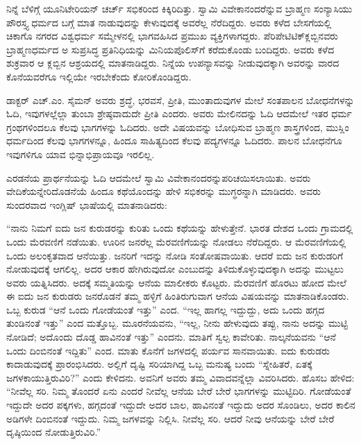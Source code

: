 ನಿನ್ನೆ ಬೆಳಿಗ್ಗೆ ಯೂನಿಟೇರಿಯನ್​ ಚರ್ಚ್​ ಸಭಿಕರಿಂದ ಕಿಕ್ಕಿರಿದಿತ್ತು. ಸ್ವಾಮಿ ವಿವೇಕಾನಂದ\break ರೆನ್ನುವ ಬ್ರಾಹ್ಮಣ ಸಂನ್ಯಾಸಿಯು ಪೌರಸ್ತ್ಯ ಧರ್ಮದ ಬಗ್ಗೆ ಮಾತ ನಾಡುವುದನ್ನು ಕೇಳುವುದಕ್ಕೆ ಅವರೆಲ್ಲ ನೆರೆದಿದ್ದರು. ಅವರು ಕಳೆದ ಬೇಸಗೆಯಲ್ಲಿ ಚಿಕಾಗೊ ನಗರದ ವಿಶ್ವಧರ್ಮ ಸಮ್ಮೇಳನಲ್ಲಿ ಭಾಗವಹಿಸಿದ ಪ್ರಮುಖ ವ್ಯಕ್ತಿಗಳಾಗದ್ದರು. ಪೆರಿಪೇಟಿಟಿಕ್​ ಕ್ಲಬ್ಬಿನವರು ಬ್ರಾಹ್ಮಣಧರ್ಮದ ಅ ಸುಪ್ರಸಿದ್ಧ ಪ್ರತಿನಿಧಿಯನ್ನು ಮಿನಿಯಪೊಲಿಸ್​ಗೆ ಕರೆದುಕೊಂಡು ಬಂದಿದ್ದರು. ಅವರು ಕಳೆದ ಶುಕ್ರವಾರ ಆ ಕ್ಲಬ್ಬಿನ ಆಶ್ರಯದಲ್ಲಿ ಮಾತನಾಡಿದ್ದರು. ನಿನ್ನೆಯ ಉಪನ್ಯಾಸವನ್ನು ನೀಡುವುದಕ್ಕಾಗಿ ಅವರನ್ನು ವಾರದ ಕೊನೆಯವರೆಗೂ ಇಲ್ಲಿಯೇ ಇರಬೇಕೆಂದು ಕೋರಿಕೊಂಡಿದ್ದರು.

ಡಾಕ್ಟರ್​ ಎಚ್​.ಎಂ. ಸೈಮನ್​ ಅವರು ಶ್ರದ್ಧೆ, ಭರವಸೆ, ಪ್ರೀತಿ, ಮುಂತಾದುವುಗಳ ಮೇಲೆ ಸಂತಪಾಲನ ಬೋಧನೆಗಳನ್ನು ಓದಿ, ಇವುಗಳಲ್ಲೆಲ್ಲಾ ತುಂಬಾ ಶ್ರೇಷ್ಠವಾದುದೇ ಪ್ರೀತಿ ಎಂದರು. ಅವರು ಮೇಲಿನದನ್ನು ಓದಿ ಆದಮೇಲೆ ಇತರ ಧರ್ಮ ಗ್ರಂಥಗಳಿಂದಲೂ ಕೆಲವು ಭಾಗಗಳನ್ನು ಓದಿದರು. ಅದೇ ವಿಷಯವನ್ನು ಬೋಧಿಸುವ ಬ್ರಾಹ್ಮಣ ಶಾಸ್ತ್ರಗಳಿಂದ, ಮುಸ್ಲಿಂ ಧರ್ಮದಿಂದ ಕೆಲವು ಭಾಗಗಳನ್ನೂ, ಹಿಂದೂ ಸಾಹಿತ್ಯದಿಂದ ಕೆಲವು ಪದ್ಯಗಳನ್ನೂ ಓದಿದರು. ಪಾಲನ ಬೋಧನೆಗೂ ಇವುಗಳಿಗೂ ಯಾವ ಭಿನ್ನಾಭಿಪ್ರಾಯವೂ ಇರಲಿಲ್ಲ.

ಎರಡನೆಯ ಪ್ರಾರ್ಥನೆಯನ್ನು ಓದಿ ಆದಮೇಲೆ ಸ್ವಾಮಿ ವಿವೇಕಾನಂದರನ್ನು\break ಪರಿಚಯಿಸಲಾಯಿತು. ಅವರು ವೇದಿಕೆಯನ್ನೇರಿದೊಡನೆಯೆ ಹಿಂದೂ ಕಥೆಯೊಂದನ್ನು ಹೇಳಿ ಸಭಿಕರನ್ನು ಮುಗ್ಧರನ್ನಾಗಿ ಮಾಡಿದರು. ಅವರು ಸುಂದರವಾದ ಇಂಗ್ಲಿಷ್​ ಭಾಷೆಯಲ್ಲಿ ಮಾತನಾಡಿದರು:

“ನಾನು ನಿಮಗೆ ಐದು ಜನ ಕುರುಡರನ್ನು ಕುರಿತು ಒಂದು ಕಥೆಯನ್ನು ಹೇಳುತ್ತೇನೆ. ಭಾರತ ದೇಶದ ಒಂದು ಗ್ರಾಮದಲ್ಲಿ ಒಂದು ಮೆರವಣಿಗೆ ನಡೆಯಿತು. ಊರಿನ ಜನರೆಲ್ಲ ಮೆರವಣಿಗೆಯನ್ನು ನೋಡಲು ನೆರೆದಿದ್ದರು. ಆ ಮೆರವಣಿಗೆಯಲ್ಲಿ ಒಂದು ಅಲಂಕೃತವಾದ ಆನೆಯಿತ್ತು. ಜನರಿಗೆ ಇದನ್ನು ನೋಡಿ ಸಂತೋಷವಾಯಿತು. ಆದರೆ ಐದು ಜನ ಕುರುಡರಿಗೆ ನೋಡುವುದಕ್ಕೆ ಆಗಲಿಲ್ಲ. ಅದರ ಆಕಾರ ಹೇಗಿರುವುದೋ ಎಂಬುದನ್ನು ತಿಳಿದುಕೊಳ್ಳುವುದಕ್ಕಾಗಿ ಅದನ್ನು ಮುಟ್ಟಲು ಅವರು ಯತ್ನಿಸಿದರು. ಅದಕ್ಕೆ ಸಮ್ಮತಿಯನ್ನು ಆನೆಯ ಮಾಲೀಕರು ಕೊಟ್ಟರು. ಮೆರವಣಿಗೆ ಹೊರಟು ಹೋದ ಮೇಲೆ ಈ ಐದು ಜನ ಕುರುಡರು ಜನರೊಡನೆ ತಮ್ಮ ಹಳ್ಳಿಗೆ ಹಿಂತಿರುಗುವಾಗ ಆನೆಯ ವಿಷಯವನ್ನು ಮಾತನಾಡಿಕೊಂಡರು. ಒಬ್ಬ ಕುರುಡ “ಆನೆ ಒಂದು ಗೋಡೆಯಂತೆ ಇತ್ತು” ಎಂದ. “ಇಲ್ಲ ಹಾಗಲ್ಲ ಇದ್ದುದ್ದು, ಅದು ಒಂದು ಹಗ್ಗದ ತುಂಡಿನಂತೆ ಇತ್ತು” ಎಂದ ಮತ್ತೊಬ್ಬ. ಮೂರನೆಯವನು, “ಇಲ್ಲ, ನೀನು ಹೇಳುವುದು ತಪ್ಪು, ನಾನು ಅದನ್ನು ಮುಟ್ಟಿ ನೋಡಿದೆ; ಅದೊಂದು ದೊಡ್ಡ ಹಾವಿನಂತೆ ಇತ್ತು” ಎಂದನು. ಮಾತಿಗೆ ಸ್ವಲ್ಪ ಕಾವೇರಿತು. ನಾಲ್ಕನೆಯವನು “ಆನೆ ಒಂದು ದಿಂಬಿನಂತೆ ಇದ್ದಿತು” ಎಂದ. ಮಾತು ಕೊನೆಗೆ ಜಗಳದಲ್ಲಿ ಪರ್ಯವ ಸಾನವಾಯಿತು. ಐದು ಕುರುಡರು ಕಾದಾಡುವುದಕ್ಕೆ ಪ್ರಾರಂಭಿಸಿದರು. ಅಲ್ಲಿಗೆ ದೃಷ್ಟಿ ಸರಿಯಾಗಿದ್ದ ಒಬ್ಬ ಮನುಷ್ಯ ಬಂದು “ಸ್ನೇಹಿತರೆ, ಏತಕ್ಕೆ ಜಗಳಕಾಯುತ್ತಿರುವಿರಿ?” ಎಂದು ಕೇಳಿದನು. ಅವನಿಗೆ ಅವರು ತಮ್ಮ ವಿವಾದವನ್ನೆಲ್ಲಾ ವಿವರಿಸಿದರು. ಹೊಸಬ ಹೇಳಿದ: “ನೀವೆಲ್ಲ ಸರಿ. ನಿಮ್ಮ ತೊಂದರೆ ಏನು ಎಂದರೆ ನೀವೆಲ್ಲ ಆನೆಯ ಬೇರೆ ಬೇರೆ ಭಾಗಗಳನ್ನು ಮುಟ್ಟಿದಿರಿ. ಗೋಡೆಯಂತೆ ಇದ್ದುದೇ ಅದರ ಪಕ್ಕಗಳು, ಹಗ್ಗದಂತೆ ಇದ್ದುದೇ ಅದರ ಬಾಲ, ಹಾವಿನಂತೆ ಇದ್ದುದು ಅದರ ಸೊಂಡಿಲು, ಅದರ ಕಾಲಿನ ಅಡಿಗಳೇ ದಿಂಬಿನಂತೆ ಇದ್ದುದು. ನಿಮ್ಮ ಜಗಳವನ್ನು ನಿಲ್ಲಿಸಿ. ನೀವೆಲ್ಲ ಸರಿ. ಆದರೆ ನೀವು ಆನೆಯನ್ನು ಬೇರೆ ಬೇರೆ ದೃಷ್ಠಿಯಿಂದ ನೋಡುತ್ತಿರುವಿರಿ.”

